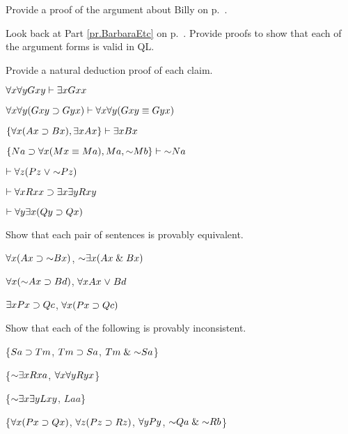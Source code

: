 \problempart
Provide a proof of the argument about Billy on p.~\pageref{surgeon2}.



\problempart
\label{pr.BarbaraEtc.proof1}
Look back at Part \ref{pr.BarbaraEtc} on p.~\pageref{pr.BarbaraEtc}. Provide proofs to show that each of the argument forms is valid in QL.




\solutions
\problempart
\label{pr.QLproofsNDe}
Provide a natural deduction proof of each claim.
\begin{earg}
\item $\forall x \forall y Gxy\vdash\exists x Gxx$
\item $\forall x \forall y (Gxy \supset Gyx) \vdash \forall x\forall y (Gxy \equiv Gyx)$
\item $\{\forall x(Ax\supset Bx), \exists x Ax\} \vdash \exists x Bx$
\item $\{Na \eif \qt{\forall}{x}(Mx \eiff Ma), Ma, \enot Mb\}\vdash \enot Na$
\item $\vdash\qt{\forall}{z} (Pz \eor \enot Pz)$
\item $\vdash\forall x Rxx\supset \exists x \exists y Rxy$
\item $\vdash\forall y \exists x (Qy \supset Qx)$
\end{earg}



\problempart
Show that each pair of sentences is provably equivalent.
\begin{earg}
\item $\qt{\forall}{x} (Ax\eif \enot Bx)$, $\enot\qt{\exists}{x}(Ax \eand Bx)$
\item $\qt{\forall}{x} (\enot Ax\eif Bd)$, $\forall x Ax \mkern1mu\vee\mkern1mu Bd$
\item $\exists x Px \supset Qc$, $\forall x (Px \supset Qc)$
\end{earg}



\problempart
Show that each of the following is provably inconsistent.
\begin{earg}
\item \{$Sa\supset Tm$, $Tm \supset Sa$, $Tm \eand \enot Sa$\}
\item \{$\enot\qt{\exists}{x} Rxa$, $\forall x \forall y Ryx$\}
\item \{$\enot\qt{\exists}{x} \qt{\exists}{y} Lxy$, $Laa$\}
\item \{$\forall x(Px \supset Qx)$, $\forall z(Pz \supset Rz)$, $\forall y Py$, $\enot Qa \eand \enot Rb$\}
\end{earg}



